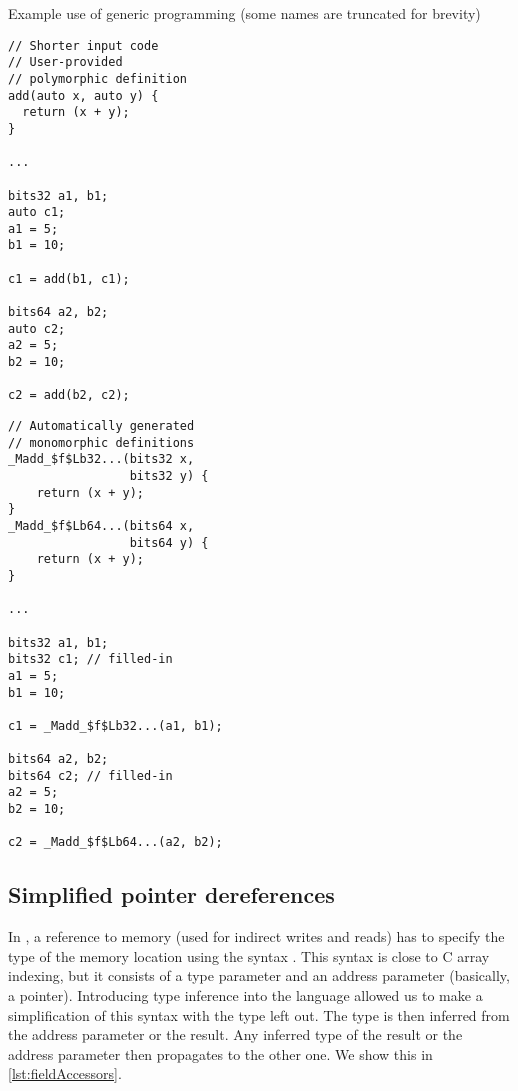 \begin{codex}
    \caption{Example use of generic programming (some names are truncated for brevity)}
    \label{lst:reduction}
    \begin{center}
    \begin{minipage}{0.5\linewidth}
    \begin{lstlisting}
// Shorter input code
// User-provided
// polymorphic definition
add(auto x, auto y) {
  return (x + y);
}

...

bits32 a1, b1;
auto c1;
a1 = 5;
b1 = 10;

c1 = add(b1, c1);

bits64 a2, b2;
auto c2;
a2 = 5;
b2 = 10;

c2 = add(b2, c2);
    \end{lstlisting}
    \end{minipage}%
    \begin{minipage}{0.5\linewidth}
    \begin{lstlisting}
// Automatically generated
// monomorphic definitions
_Madd_$f$Lb32...(bits32 x,
                 bits32 y) {
    return (x + y);
}
_Madd_$f$Lb64...(bits64 x,
                 bits64 y) {
    return (x + y);
}

...

bits32 a1, b1;
bits32 c1; // filled-in
a1 = 5;
b1 = 10;

c1 = _Madd_$f$Lb32...(a1, b1);

bits64 a2, b2;
bits64 c2; // filled-in
a2 = 5;
b2 = 10;

c2 = _Madd_$f$Lb64...(a2, b2);
    \end{lstlisting}
    \end{minipage}
    \end{center}
\end{codex}

\subsection{Simplified pointer dereferences}

In \cmm, a reference to memory (used for indirect writes and reads) has to specify the type of the memory location using the syntax . This syntax is close to C array indexing, but it consists of a type parameter and an address parameter (basically, a pointer). Introducing type inference into the language allowed us to make a simplification of this syntax with the type left out. The type is then inferred from the address parameter or the result. Any inferred type of the result or the address parameter then propagates to the other one. We show this in \cref{lst:fieldAccessors}.

